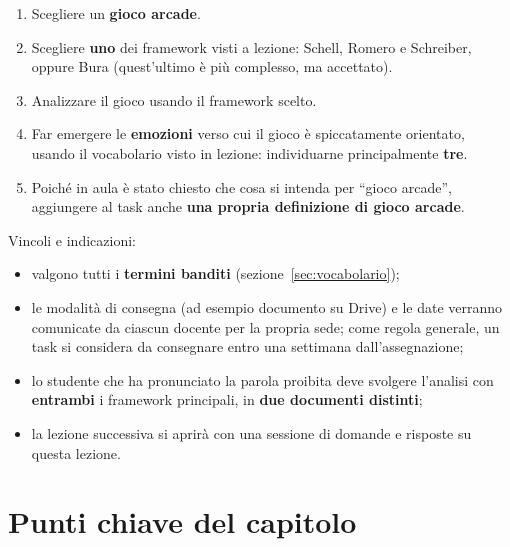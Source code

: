\begin{enumerate}
  \item Scegliere un \textbf{gioco arcade}.
  \item Scegliere \textbf{uno} dei framework visti a lezione: Schell, Romero e
        Schreiber, oppure Bura (quest'ultimo è più complesso, ma accettato).
  \item Analizzare il gioco usando il framework scelto.
  \item Far emergere le \textbf{emozioni} verso cui il gioco è spiccatamente
        orientato, usando il vocabolario visto in lezione: individuarne
        principalmente \textbf{tre}.
  \item Poiché in aula è stato chiesto che cosa si intenda per ``gioco
        arcade'', aggiungere al task anche \textbf{una propria definizione di
        gioco arcade}.
\end{enumerate}
Vincoli e indicazioni:
\begin{itemize}
  \item valgono tutti i \textbf{termini banditi} (sezione~\ref{sec:vocabolario});
  \item le modalità di consegna (ad esempio documento su Drive) e le date
        verranno comunicate da ciascun docente per la propria sede; come regola
        generale, un task si considera da consegnare entro una settimana
        dall'assegnazione;
  \item lo studente che ha pronunciato la parola proibita deve svolgere
        l'analisi con \textbf{entrambi} i framework principali, in
        \textbf{due documenti distinti};
  \item la lezione successiva si aprirà con una sessione di domande e risposte
        su questa lezione.
\end{itemize}

\section*{Punti chiave del capitolo}

